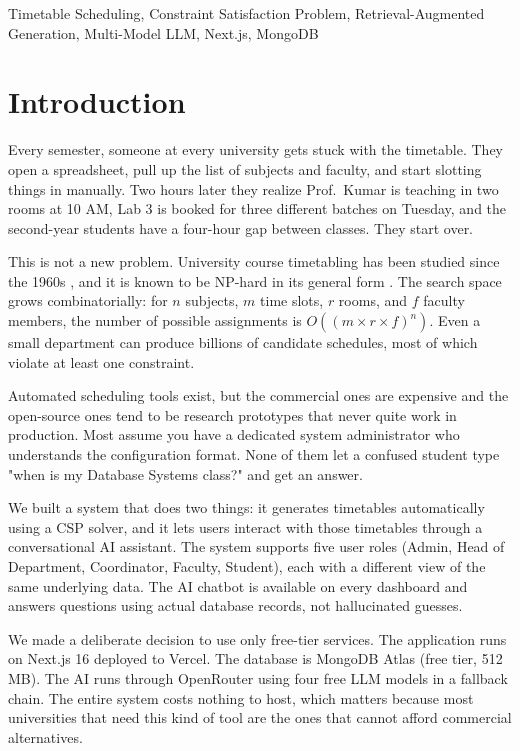 \documentclass[conference]{IEEEtran}
\begin{document}
\begin{IEEEkeywords}
Timetable Scheduling, Constraint Satisfaction Problem, Retrieval-Augmented Generation, Multi-Model LLM, Next.js, MongoDB
\end{IEEEkeywords}

\section{Introduction}

Every semester, someone at every university gets stuck with the timetable. They open a spreadsheet, pull up the list of subjects and faculty, and start slotting things in manually. Two hours later they realize Prof.\ Kumar is teaching in two rooms at 10 AM, Lab 3 is booked for three different batches on Tuesday, and the second-year students have a four-hour gap between classes. They start over.

This is not a new problem. University course timetabling has been studied since the 1960s \cite{even1975complexity}, and it is known to be NP-hard in its general form \cite{cooper1996complexity}. The search space grows combinatorially: for $n$ subjects, $m$ time slots, $r$ rooms, and $f$ faculty members, the number of possible assignments is $O((m \times r \times f)^n)$. Even a small department can produce billions of candidate schedules, most of which violate at least one constraint.

Automated scheduling tools exist, but the commercial ones are expensive and the open-source ones tend to be research prototypes that never quite work in production. Most assume you have a dedicated system administrator who understands the configuration format. None of them let a confused student type "when is my Database Systems class?" and get an answer.

We built a system that does two things: it generates timetables automatically using a CSP solver, and it lets users interact with those timetables through a conversational AI assistant. The system supports five user roles (Admin, Head of Department, Coordinator, Faculty, Student), each with a different view of the same underlying data. The AI chatbot is available on every dashboard and answers questions using actual database records, not hallucinated guesses.

We made a deliberate decision to use only free-tier services. The application runs on Next.js 16 deployed to Vercel. The database is MongoDB Atlas (free tier, 512 MB). The AI runs through OpenRouter using four free LLM models in a fallback chain. The entire system costs nothing to host, which matters because most universities that need this kind of tool are the ones that cannot afford commercial alternatives.
\end{document}

